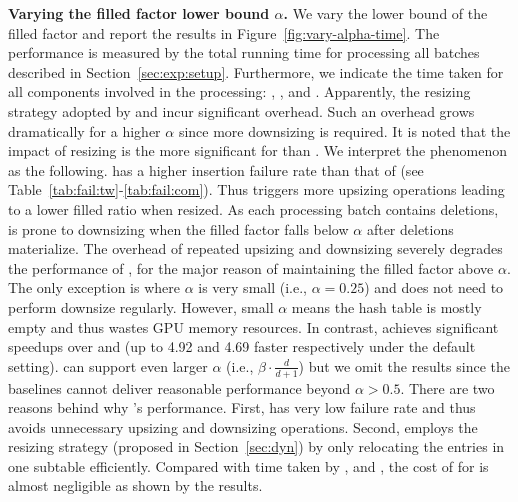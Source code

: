 \vspace{1mm}\noindent\textbf{Varying the filled factor lower bound $\alpha$.}
We vary the lower bound of the filled factor and report the results in Figure~\ref{fig:vary-alpha-time}. 
The performance is measured by the total running time for processing all batches described in Section~\ref{sec:exp:setup}. Furthermore, we indicate the time taken for all components involved in the processing: , ,  and . Apparently, the resizing strategy adopted by \linear and \megakv incur significant overhead. Such an overhead grows dramatically for a higher $\alpha$ since more downsizing is required. It is noted that the impact of resizing is the more significant for \megakv than \linear. We interpret the phenomenon as the following.
\megakv has a higher insertion failure rate than that of \linear (see Table~\ref{tab:fail:tw}-\ref{tab:fail:com}). Thus \megakv triggers more upsizing operations leading to a lower filled ratio when resized. As each processing batch contains deletions, \megakv is prone to downsizing when the filled factor falls below $\alpha$ after deletions materialize.
The overhead of repeated upsizing and downsizing severely degrades the performance of \megakv, for the major reason of maintaining the filled factor above $\alpha$. 
The only exception is where $\alpha$ is very small (i.e., $\alpha=0.25$) and \megakv does not need to perform downsize regularly. However, small $\alpha$ means the hash table is mostly empty and thus wastes GPU memory resources.
In contrast, \voter achieves significant speedups over \linear and \megakv (up to 4.92 and 4.69 faster respectively under the default setting). 
\voter can support even larger $\alpha$ (i.e., $\beta\cdot\frac{d}{d+1}$) but we omit the results since the baselines cannot deliver reasonable performance beyond $\alpha > 0.5$.
There are two reasons behind why \voter's performance. First, \voter has very low failure rate and thus avoids unnecessary upsizing and downsizing operations. Second, \voter employs the resizing strategy (proposed in Section~\ref{sec:dyn}) by only relocating the entries in one subtable efficiently. 
Compared with time taken by ,  and , the cost of  for \voter is almost negligible as shown by the results. 



